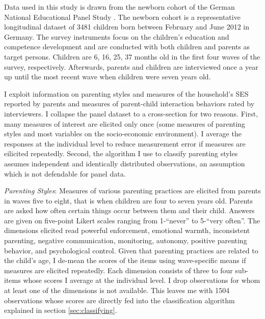Data used in this study is drawn from the newborn cohort of the German National Educational Panel Study \parencite{nepsnationaleducationalpanelstudybamberggermanyNEPSStartingCohort2021}. The newborn cohort is a representative longitudinal dataset of 3481 children born between February and June 2012 in Germany. The survey instruments focus on the children's education and competence development and are conducted with both children and parents as target persons. Children are 6, 16, 25, 37 months old in the first four waves of the survey, respectively. Afterwards, parents and children are interviewed once a year up until the most recent wave when children were seven years old. 

I exploit information on parenting styles and measures of the household's SES reported by parents and measures of parent-child interaction behaviors rated by interviewers. I collapse the panel dataset to a cross-section for two reasons. First, many measures of interest are elicited only once (some measures of parenting styles and most variables on the socio-economic environment). I average the responses at the individual level to reduce measurement error if measures are eilicited repeatedly. Second, the algorithm I use to classify parenting styles assumes independent and identically distributed observations, an assumption which is not defendable for panel data.

\textit{Parenting Styles}: Measures of various parenting practices are elicited from parents in waves five to eight, that is when children are four to seven years old. Parents are asked how often certain things occur between them and their child. Answers are given on five-point Likert scales ranging from 1-``never'' to 5-``very often''. The dimensions elicited read powerful enforcement, emotional warmth, inconsistent parenting, negative communication, monitoring, autonomy, positive parenting behavior, and psychological control. Given that parenting practices are related to the child's age, I de-mean the scores of the items using wave-specific means if measures are elicited repeatedly. Each dimension consists of three to four sub-items whose scores I average at the individual level. I drop observations for whom at least one of the dimensions is not available. This leaves me with 1504 observations whose scores are directly fed into the classification algorithm explained in section \ref{sec:classifying}.

